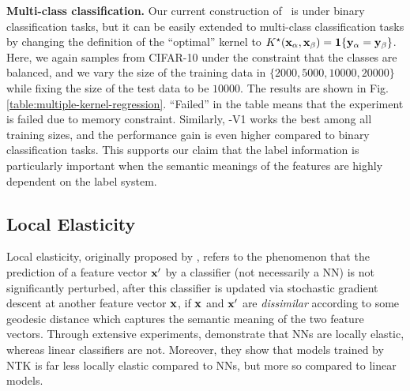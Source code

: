 {\bf Multi-class classification.} Our current construction of \lantk~is under binary classification tasks, but it can be easily extended to multi-class classification tasks by changing the definition of the ``optimal'' kernel to $K^{\star}({\mathbf{x}}_\alpha, {\mathbf{x}}_\beta) = \mathbf{1}\{{\mathbf{y}}_\alpha={\mathbf{y}}_\beta\}$. Here, we again samples from CIFAR-10 under the constraint that the classes are balanced, and we vary the size of the training data in $\{2000, 5000, 10000, 20000\}$ while fixing the size of the test data to be $10000$. 
The results are shown in Fig. \ref{table:multiple-kernel-regression}. ``Failed'' in the table means that the experiment is failed due to memory constraint.
Similarly, \lantkFJLT-V1 works the best among all training sizes, and the performance gain is even higher compared to binary classification tasks. This supports our claim that the label information is particularly important when the semantic meanings of the features are highly dependent on the label system.

















\subsection{Local Elasticity}
\label{subsec:local-elasticity}
Local elasticity, originally proposed by \citet{he2019local}, refers to the phenomenon that the prediction of a feature vector ${\mathbf{x}}'$ by a classifier (not necessarily a NN) is not significantly perturbed, after this classifier is updated via stochastic gradient descent at another feature vector ${\mathbf{x}}$, if ${\mathbf{x}}$ and ${\mathbf{x}}'$ are \emph{dissimilar} according to some geodesic distance which captures the semantic meaning of the two feature vectors. 
Through extensive experiments, \citet{he2019local} demonstrate that NNs are locally elastic, whereas linear classifiers are not. Moreover, they show that models trained by NTK is far less locally elastic compared to NNs, but more so compared to linear models. 

